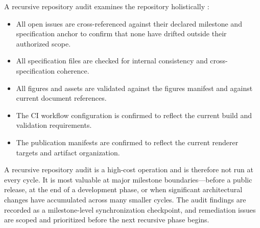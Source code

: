 A recursive repository audit examines the repository holistically \cite{Wiener1948Cybernetics}:
\begin{itemize}
  \item All open issues are cross-referenced against their declared milestone and specification anchor to confirm that none have drifted outside their authorized scope.
  \item All specification files are checked for internal consistency and cross-specification coherence.
  \item All figures and assets are validated against the figures manifest and against current document references.
  \item The CI workflow configuration is confirmed to reflect the current build and validation requirements.
  \item The publication manifests are confirmed to reflect the current renderer targets and artifact organization.
\end{itemize}

A recursive repository audit is a high-cost operation and is therefore not run at every cycle. It is most valuable at major milestone boundaries---before a public release, at the end of a development phase, or when significant architectural changes have accumulated across many smaller cycles. The audit findings are recorded as a milestone-level synchronization checkpoint, and remediation issues are scoped and prioritized before the next recursive phase begins.
